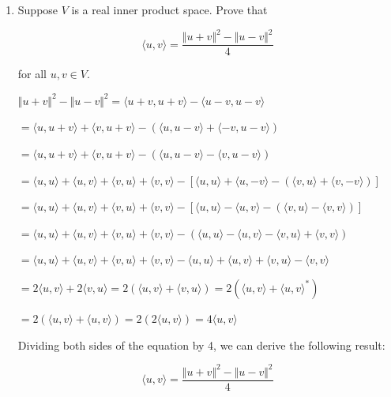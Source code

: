 \documentclass[fleqn]{article}
\makeatletter
\newenvironment{equationCenter}{\@fleqnfalse\begin{equation*}}{\end{equation*}}
\makeatother
\begin{document}
\begin{enumerate}[nolistsep]
			\item Suppose $V$ is a real inner product space. Prove that
			
				\begin{equationCenter}
					\langle u, v\rangle = \frac{{\Vert u + v \Vert}^2 - {\Vert u - v \Vert}^2}{4}
				\end{equationCenter}
				
				for all $u, v \in V$.
				
				${\Vert u + v \Vert}^2 - {\Vert u - v \Vert}^2 = \langle u + v, u + v \rangle - \langle u - v, u - v \rangle$
				
				$ = \langle u, u + v \rangle + \langle v, u + v \rangle - (\langle u, u - v\rangle + \langle -v, u - v \rangle)$
				
				$ = \langle u, u + v \rangle + \langle v, u + v \rangle - (\langle u, u - v\rangle - \langle v, u - v \rangle)$
					
				$ = \langle u, u \rangle + \langle u, v \rangle + \langle v, u \rangle + \langle v, v \rangle - [\langle u, u\rangle + \langle u, -v\rangle - (\langle v, u \rangle + \langle v, -v \rangle)]$
				
				$ = \langle u, u \rangle + \langle u, v \rangle + \langle v, u \rangle + \langle v, v \rangle - [\langle u, u\rangle - \langle u, v\rangle - (\langle v, u \rangle - \langle v, v \rangle)]$
				
				$ = \langle u, u \rangle + \langle u, v \rangle + \langle v, u \rangle + \langle v, v \rangle - (\langle u, u\rangle - \langle u, v\rangle - \langle v, u \rangle + \langle v, v \rangle)$
				
				$ = \langle u, u \rangle + \langle u, v \rangle + \langle v, u \rangle + \langle v, v \rangle - \langle u, u\rangle + \langle u, v\rangle + \langle v, u \rangle - \langle v, v \rangle$
				
				$ = 2\langle u, v \rangle + 2 \langle v, u \rangle = 2(\langle u, v \rangle + \langle v, u \rangle) = 2(\langle u, v \rangle + {\langle u, v \rangle}^*)$
				
				$ = 2(\langle u, v \rangle + \langle u, v \rangle) = 2(2\langle u, v \rangle) = 4\langle u, v \rangle$
				
				Dividing both sides of the equation by 4, we can derive the following result:
				
				\begin{equation*}
					\langle u, v\rangle = \frac{{\Vert u + v \Vert}^2 - {\Vert u - v \Vert}^2}{4}
				\end{equation*}
				

\end{enumerate}
\end{document}
